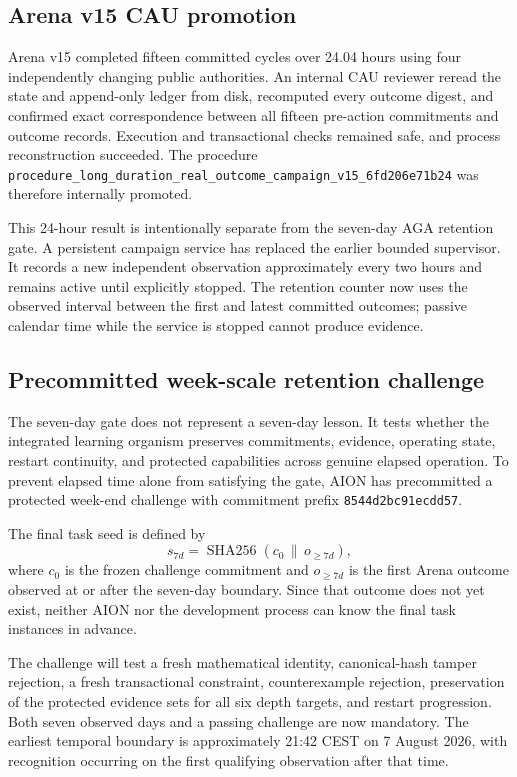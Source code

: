 \subsection{Arena v15 CAU promotion}

Arena v15 completed fifteen committed cycles over 24.04 hours using four
independently changing public authorities.  An internal CAU reviewer reread the
state and append-only ledger from disk, recomputed every outcome digest, and
confirmed exact correspondence between all fifteen pre-action commitments and
outcome records.  Execution and transactional checks remained safe, and process
reconstruction succeeded.  The procedure
\texttt{procedure\_long\_duration\_real\_outcome\_campaign\_v15\_6fd206e71b24}
was therefore internally promoted.

This 24-hour result is intentionally separate from the seven-day AGA retention
gate.  A persistent campaign service has replaced the earlier bounded
supervisor.  It records a new independent observation approximately every two
hours and remains active until explicitly stopped.  The retention counter now
uses the observed interval between the first and latest committed outcomes;
passive calendar time while the service is stopped cannot produce evidence.

\subsection{Precommitted week-scale retention challenge}

The seven-day gate does not represent a seven-day lesson.  It tests whether the
integrated learning organism preserves commitments, evidence, operating state,
restart continuity, and protected capabilities across genuine elapsed
operation.  To prevent elapsed time alone from satisfying the gate, AION has
precommitted a protected week-end challenge with commitment prefix
\texttt{8544d2bc91ecdd57}.

The final task seed is defined by
\[
s_{7d}=\operatorname{SHA256}
\left(c_{0}\,\|\,o_{\geq 7d}\right),
\]
where $c_{0}$ is the frozen challenge commitment and $o_{\geq 7d}$ is the first
Arena outcome observed at or after the seven-day boundary.  Since that outcome
does not yet exist, neither AION nor the development process can know the final
task instances in advance.

The challenge will test a fresh mathematical identity, canonical-hash tamper
rejection, a fresh transactional constraint, counterexample rejection,
preservation of the protected evidence sets for all six depth targets, and
restart progression.  Both seven observed days and a passing challenge are now
mandatory.  The earliest temporal boundary is approximately 21:42 CEST on
7 August 2026, with recognition occurring on the first qualifying observation
after that time.

